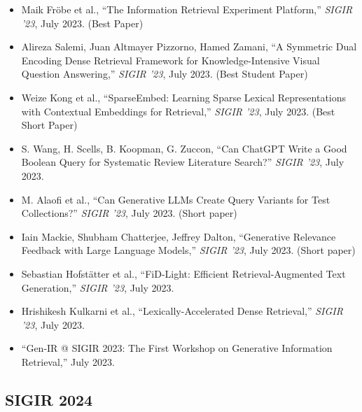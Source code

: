 \documentclass[11pt,letterpaper]{article}
\begin{document}
\begin{itemize}[leftmargin=*]
    \item Maik Fröbe et al., ``The Information Retrieval Experiment Platform,'' \textit{SIGIR '23}, July 2023. (Best Paper)

    \item Alireza Salemi, Juan Altmayer Pizzorno, Hamed Zamani, ``A Symmetric Dual Encoding Dense Retrieval Framework for Knowledge-Intensive Visual Question Answering,'' \textit{SIGIR '23}, July 2023. (Best Student Paper)

    \item Weize Kong et al., ``SparseEmbed: Learning Sparse Lexical Representations with Contextual Embeddings for Retrieval,'' \textit{SIGIR '23}, July 2023. (Best Short Paper)

    \item S. Wang, H. Scells, B. Koopman, G. Zuccon, ``Can ChatGPT Write a Good Boolean Query for Systematic Review Literature Search?'' \textit{SIGIR '23}, July 2023.

    \item M. Alaofi et al., ``Can Generative LLMs Create Query Variants for Test Collections?'' \textit{SIGIR '23}, July 2023. (Short paper)

    \item Iain Mackie, Shubham Chatterjee, Jeffrey Dalton, ``Generative Relevance Feedback with Large Language Models,'' \textit{SIGIR '23}, July 2023. (Short paper)

    \item Sebastian Hofstätter et al., ``FiD-Light: Efficient Retrieval-Augmented Text Generation,'' \textit{SIGIR '23}, July 2023.

    \item Hrishikesh Kulkarni et al., ``Lexically-Accelerated Dense Retrieval,'' \textit{SIGIR '23}, July 2023.

    \item ``Gen-IR @ SIGIR 2023: The First Workshop on Generative Information Retrieval,'' July 2023.
\end{itemize}

\subsection{SIGIR 2024}
\end{document}

